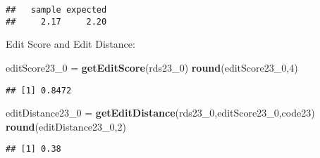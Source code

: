 \documentclass[
]{article}
\newenvironment{Shaded}{\begin{snugshade}}{\end{snugshade}}
\newcommand{\ControlFlowTok}[1]{\textcolor[rgb]{0.13,0.29,0.53}{\textbf{#1}}}
\newcommand{\DataTypeTok}[1]{\textcolor[rgb]{0.13,0.29,0.53}{#1}}
\newcommand{\DecValTok}[1]{\textcolor[rgb]{0.00,0.00,0.81}{#1}}
\newcommand{\KeywordTok}[1]{\textcolor[rgb]{0.13,0.29,0.53}{\textbf{#1}}}
\newcommand{\NormalTok}[1]{#1}
\newcommand{\OperatorTok}[1]{\textcolor[rgb]{0.81,0.36,0.00}{\textbf{#1}}}
\newcommand{\StringTok}[1]{\textcolor[rgb]{0.31,0.60,0.02}{#1}}
\begin{document}
\begin{Shaded}
\end{Shaded}

\begin{verbatim}
##   sample expected 
##     2.17     2.20
\end{verbatim}

Edit Score and Edit Distance:

\begin{Shaded}
\begin{Highlighting}[]
\NormalTok{editScore23_}\DecValTok{0}\NormalTok{ =}\StringTok{ }\KeywordTok{getEditScore}\NormalTok{(rds23_}\DecValTok{0}\NormalTok{)}
\KeywordTok{round}\NormalTok{(editScore23_}\DecValTok{0}\NormalTok{,}\DecValTok{4}\NormalTok{)}
\end{Highlighting}
\end{Shaded}

\begin{verbatim}
## [1] 0.8472
\end{verbatim}

\begin{Shaded}
\begin{Highlighting}[]
\NormalTok{editDistance23_}\DecValTok{0}\NormalTok{ =}\StringTok{ }\KeywordTok{getEditDistance}\NormalTok{(rds23_}\DecValTok{0}\NormalTok{,editScore23_}\DecValTok{0}\NormalTok{,code23)}
\KeywordTok{round}\NormalTok{(editDistance23_}\DecValTok{0}\NormalTok{,}\DecValTok{2}\NormalTok{)}
\end{Highlighting}
\end{Shaded}

\begin{verbatim}
## [1] 0.38
\end{verbatim}
\end{document}
